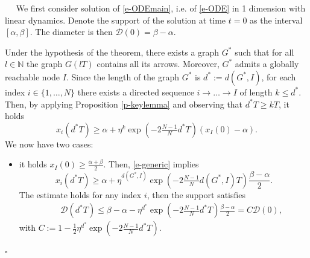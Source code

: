 \documentclass[journal]{article}
\newcommand{\N}{\mathbb{N}}
\newenvironment{proof}{{\it Proof.}~~}{\hfill$\square$}
\newcommand{\diam}[1]{\mathcal{D}(#1)}
\begin{document}
\begin{proof} We first consider solution of \eqref{e-ODEmain}, i.e. of \eqref{e-ODE} in 1 dimension with linear dynamics. Denote the support of the solution at time $t=0$ as the interval $[\alpha,\beta]$. The diameter is then $\diam{0}=\beta-\alpha$.

Under the hypothesis of the theorem, there exists a graph $G^*$ such that for all $l\in\N$ the graph $G(lT)$ contains all its arrows. Moreover, $G^*$ admits a globally reachable node $I$. Since the length of the graph $G^*$ is $d^*:=d(G^*,I)$, for each index $i\in\{1,\ldots,N\}$ there exists a directed sequence $i\to\ldots\to I$ of length $k\leq d^*$. Then, by applying Proposition \ref{p-keylemma} and observing that $d^* T\geq kT$, it holds
\begin{equation}\label{e-generic}
x_i(d^* T)\geq  \alpha+\eta^k\exp(-2\tfrac{N-1}{N}d^*T)(x_{I}(0)-\alpha).
\end{equation}
We now have two cases:
\begin{itemize}
\item it holds $x_I(0)\geq \frac{\alpha+\beta}{2}$. Then, \eqref{e-generic} implies 
$$x_i(d^*T)\geq  \alpha+\eta^{d(G^*,I)}\exp(-2\tfrac{N-1}{N}d(G^*,I)T)\frac{\beta-\alpha}{2}.$$
The estimate holds for any index $i$, then the support satisfies 
\begin{eqnarray}\label{diam-est1}
\
&&\diam{d^*T}\leq \beta- \alpha-\eta^{d^*}\exp(-2\tfrac{N-1}{N}d^*T)\tfrac{\beta-\alpha}{2} =  C \diam{0},\label{e-stimaxi}
\end{eqnarray}
with $C:=1-\tfrac12 \eta^{d^*}\exp(-2\tfrac{N-1}{N}d^*T).$


\end{itemize}
\end{proof}
\end{document}

